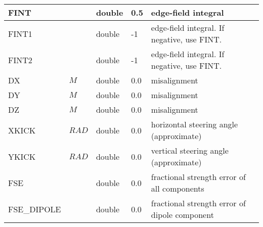 \begin{tabular}{|l|l|l|l|p{\descwidth}|}
FINT &  & double &   0.5 & edge-field integral  \\ \hline 
FINT1 &  & double &   -1 & edge-field integral. If negative, use FINT.  \\ \hline 
FINT2 &  & double &   -1 & edge-field integral. If negative, use FINT.  \\ \hline 
DX & $M$ & double &  0.0 & misalignment  \\ \hline 
DY & $M$ & double &  0.0 & misalignment  \\ \hline 
DZ & $M$ & double &  0.0 & misalignment  \\ \hline 
XKICK & $RAD$ & double &  0.0 & horizontal steering angle (approximate)  \\ \hline 
YKICK & $RAD$ & double &  0.0 & vertical steering angle (approximate)  \\ \hline 
FSE &  & double &  0.0 & fractional strength error of all components  \\ \hline 
FSE\_DIPOLE &  & double &  0.0 & fractional strength error of dipole component  \\ \hline 
\end{tabular}


